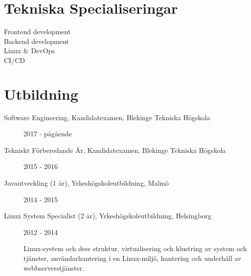 \documentclass{article}
\begin{document}
\begin{minipage}[t]{0.35\textwidth}
	
	\section*{\textcolor{colorBlue}{Tekniska Specialiseringar}}
	
	\begin{description}
		\item [ Frontend development ]
		\item [ Backend development ]
		\vspace{-5pt}\item [ Linux \& DevOps ] 
		\vspace{-5pt}\item [ CI/CD ]
		\vspace{-5pt}
	\end{description}
	
\end{minipage}%
\hfill
\begin{minipage}[t]{0.7\textwidth}
	
	\section*{\textcolor{colorBlue}{Utbildning}}
	
	\begin{description}
		\item [ Software Engineering, Kandidatexamen, Blekinge Tekniska Högskola] 2017 - pågående
		\item [ Tekniskt Förberedande År, Kandidatexamen, Blekinge Tekniska Högskola] 2015 - 2016
		\item [ Javautveckling (1 år), Yrkeshögskoleutbildning, Malmö ] 2014 - 2015
		\item [ Linux System Specialist (2 år), Yrkeshögskoleutbildning, Helsingborg ] 2012 - 2014 
		
		Linux-system och dess struktur, virtualisering och klustring av system och tjänster, användarhantering i en Linux-miljö, hantering och underhåll av webbserverstjänster.
	\end{description}
	
\end{minipage}%
\vspace{10pt}
\end{document}
